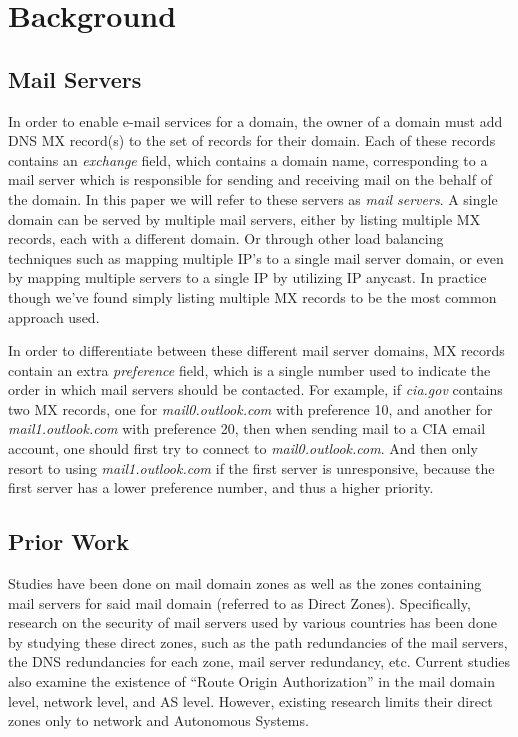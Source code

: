 \documentclass{hotnets21}
\begin{document}
\section{Background}

\subsection{Mail Servers}

In order to enable e-mail services for a domain, the owner of a domain must add DNS MX record(s) to the set of records for their domain.
Each of these records contains an \textit{exchange} field, which contains a domain name, corresponding to a mail server which is responsible for sending and receiving mail on the behalf of the domain.
In this paper we will refer to these servers as \textit{mail servers}. A single domain can be served by multiple mail servers, either by listing multiple MX records, each with a different domain.
Or through other load balancing techniques such as mapping multiple IP's to a single mail server domain, or even by mapping multiple servers to a single IP by utilizing IP anycast.
In practice though we've found simply listing multiple MX records to be the most common approach used.

In order to differentiate between these different mail server domains, MX records contain an extra \textit{preference} field, which is a single number used to indicate the order in which mail servers should be contacted.
For example, if \textit{cia.gov} contains two MX records, one for \textit{mail0.outlook.com} with preference 10, and another for \textit{mail1.outlook.com} with preference 20, then when sending mail to a CIA email account, one should first try to connect to \textit{mail0.outlook.com}.
And then only resort to using \textit{mail1.outlook.com} if the first server is unresponsive, because the first server has a lower preference number, and thus a higher priority.

\subsection{Prior Work}

Studies have been done on mail domain zones as well as the zones containing mail servers for said mail domain (referred to as Direct Zones).
Specifically, research on the security of mail servers used by various countries has been done by studying these direct zones, such as the path redundancies of the mail servers, the DNS redundancies for each zone, mail server redundancy, etc.
Current studies also examine the existence of “Route Origin Authorization” in the mail domain level, network level, and AS level.
However, existing research limits their direct zones only to network and Autonomous Systems.
\end{document}
